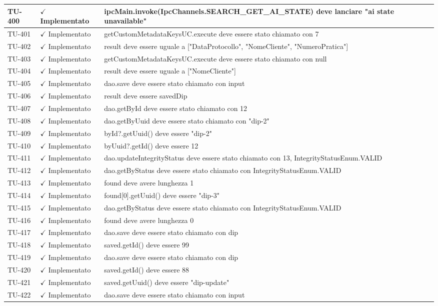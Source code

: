﻿\documentclass[a4paper,12pt]{article}
\newcommand{\ok}{\textcolor{green!60!black}{$\checkmark$ Implementato}}
\begin{document}
\begin{longtable}{|p{2cm}|p{3.5cm}|p{9.5cm}|}
\hline
TU-400 & \ok & ipcMain.invoke(IpcChannels.SEARCH\_GET\_AI\_STATE) deve lanciare "ai state unavailable" \\
\hline
TU-401 & \ok & getCustomMetadataKeysUC.execute deve essere stato chiamato con 7 \\
\hline
TU-402 & \ok & result deve essere uguale a ["DataProtocollo", "NomeCliente", "NumeroPratica"] \\
\hline
TU-403 & \ok & getCustomMetadataKeysUC.execute deve essere stato chiamato con null \\
\hline
TU-404 & \ok & result deve essere uguale a ["NomeCliente"] \\
\hline
TU-405 & \ok & dao.save deve essere stato chiamato con input \\
\hline
TU-406 & \ok & result deve essere savedDip \\
\hline
TU-407 & \ok & dao.getById deve essere stato chiamato con 12 \\
\hline
TU-408 & \ok & dao.getByUuid deve essere stato chiamato con "dip-2" \\
\hline
TU-409 & \ok & byId?.getUuid() deve essere "dip-2" \\
\hline
TU-410 & \ok & byUuid?.getId() deve essere 12 \\
\hline
TU-411 & \ok & dao.updateIntegrityStatus deve essere stato chiamato con 13, IntegrityStatusEnum.VALID \\
\hline
TU-412 & \ok & dao.getByStatus deve essere stato chiamato con IntegrityStatusEnum.VALID \\
\hline
TU-413 & \ok & found deve avere lunghezza 1 \\
\hline
TU-414 & \ok & found[0].getUuid() deve essere "dip-3" \\
\hline
TU-415 & \ok & dao.getByStatus deve essere stato chiamato con IntegrityStatusEnum.VALID \\
\hline
TU-416 & \ok & found deve avere lunghezza 0 \\
\hline
TU-417 & \ok & dao.save deve essere stato chiamato con dip \\
\hline
TU-418 & \ok & saved.getId() deve essere 99 \\
\hline
TU-419 & \ok & dao.save deve essere stato chiamato con dip \\
\hline
TU-420 & \ok & saved.getId() deve essere 88 \\
\hline
TU-421 & \ok & saved.getUuid() deve essere "dip-update" \\
\hline
TU-422 & \ok & dao.save deve essere stato chiamato con input \\

\end{longtable}
\end{document}
